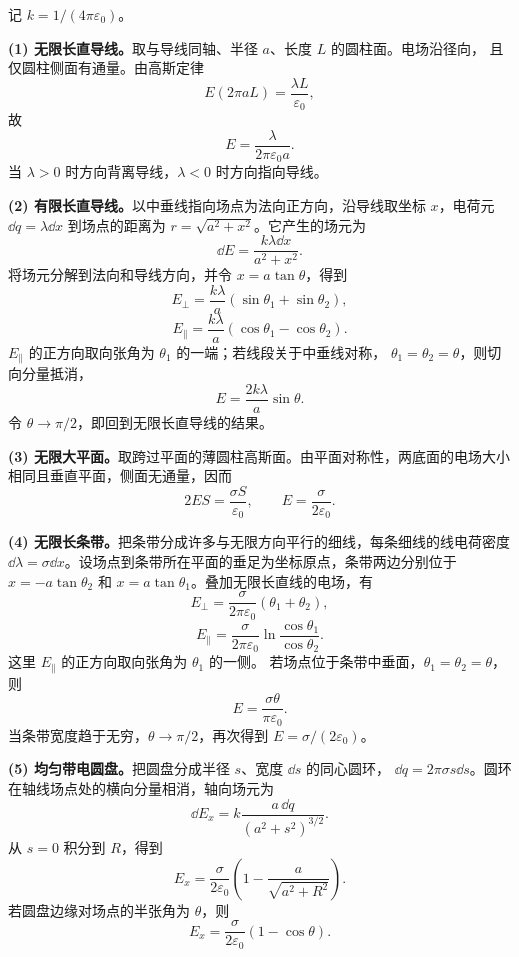 \begin{xesolution}
记 $k=1/(4\pi\varepsilon_0)$。

\textbf{(1) 无限长直导线。}取与导线同轴、半径 $a$、长度 $L$ 的圆柱面。电场沿径向，
且仅圆柱侧面有通量。由高斯定律
\[
  E(2\pi aL)=\frac{\lambda L}{\varepsilon_0},
\]
故
\[
  \boxed{E=\frac{\lambda}{2\pi\varepsilon_0a}}.
\]
当 $\lambda>0$ 时方向背离导线，$\lambda<0$ 时方向指向导线。
\lineFieldDiagram

\textbf{(2) 有限长直导线。}以中垂线指向场点为法向正方向，沿导线取坐标 $x$，电荷元
$\dd q=\lambda\dd x$ 到场点的距离为 $r=\sqrt{a^2+x^2}$。它产生的场元为
\[
  \dd E=\frac{k\lambda\dd x}{a^2+x^2}.
\]
将场元分解到法向和导线方向，并令 $x=a\tan\theta$，得到
\[
  \boxed{E_\perp=\frac{k\lambda}{a}
  (\sin\theta_1+\sin\theta_2)},
\]
\[
  \boxed{E_\parallel=\frac{k\lambda}{a}
  (\cos\theta_1-\cos\theta_2)}.
\]
$E_\parallel$ 的正方向取向张角为 $\theta_1$ 的一端；若线段关于中垂线对称，
$\theta_1=\theta_2=\theta$，则切向分量抵消，
\[
  \boxed{E=\frac{2k\lambda}{a}\sin\theta}.
\]
令 $\theta\to\pi/2$，即回到无限长直导线的结果。

\textbf{(3) 无限大平面。}取跨过平面的薄圆柱高斯面。由平面对称性，两底面的电场大小
相同且垂直平面，侧面无通量，因而
\[
  2ES=\frac{\sigma S}{\varepsilon_0},
  \qquad
  \boxed{E=\frac{\sigma}{2\varepsilon_0}}.
\]

\textbf{(4) 无限长条带。}把条带分成许多与无限方向平行的细线，每条细线的线电荷密度
$\dd\lambda=\sigma\dd x$。设场点到条带所在平面的垂足为坐标原点，条带两边分别位于
$x=-a\tan\theta_2$ 和 $x=a\tan\theta_1$。叠加无限长直线的电场，有
\[
  \boxed{E_\perp=\frac{\sigma}{2\pi\varepsilon_0}
  (\theta_1+\theta_2)},
\]
\[
  \boxed{E_\parallel=
  \frac{\sigma}{2\pi\varepsilon_0}
  \ln\frac{\cos\theta_1}{\cos\theta_2}}.
\]
这里 $E_\parallel$ 的正方向取向张角为 $\theta_1$ 的一侧。
若场点位于条带中垂面，$\theta_1=\theta_2=\theta$，则
\[
  \boxed{E=\frac{\sigma\theta}{\pi\varepsilon_0}}.
\]
当条带宽度趋于无穷，$\theta\to\pi/2$，再次得到 $E=\sigma/(2\varepsilon_0)$。

\textbf{(5) 均匀带电圆盘。}把圆盘分成半径 $s$、宽度 $\dd s$ 的同心圆环，
$\dd q=2\pi\sigma s\dd s$。圆环在轴线场点处的横向分量相消，轴向场元为
\[
  \dd E_x=k\frac{a\,\dd q}{(a^2+s^2)^{3/2}}.
\]
从 $s=0$ 积分到 $R$，得到
\[
  \boxed{E_x=\frac{\sigma}{2\varepsilon_0}
  \left(1-\frac{a}{\sqrt{a^2+R^2}}\right)}.
\]
若圆盘边缘对场点的半张角为 $\theta$，则
\[
  \boxed{E_x=\frac{\sigma}{2\varepsilon_0}(1-\cos\theta)}.
\]
\diskFieldDiagram
\end{xesolution}

